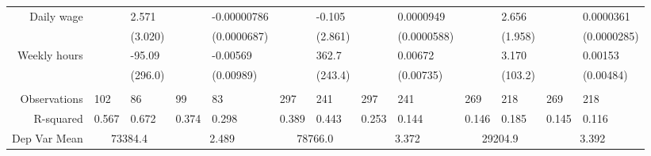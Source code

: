 \begin{tabular}{rrrrrrrrrrrrr}
Daily wage & \multicolumn{1}{l}{} & \multicolumn{1}{l}{2.571} & \multicolumn{1}{l}{} & \multicolumn{1}{l}{-0.00000786} & \multicolumn{1}{l}{} & \multicolumn{1}{l}{-0.105} & \multicolumn{1}{l}{} & \multicolumn{1}{l}{0.0000949} & \multicolumn{1}{l}{} & \multicolumn{1}{l}{2.656} & \multicolumn{1}{l}{} & \multicolumn{1}{l}{0.0000361} \\
      & \multicolumn{1}{l}{} & \multicolumn{1}{l}{(3.020)} & \multicolumn{1}{l}{} & \multicolumn{1}{l}{(0.0000687)} & \multicolumn{1}{l}{} & \multicolumn{1}{l}{(2.861)} & \multicolumn{1}{l}{} & \multicolumn{1}{l}{(0.0000588)} & \multicolumn{1}{l}{} & \multicolumn{1}{l}{(1.958)} & \multicolumn{1}{l}{} & \multicolumn{1}{l}{(0.0000285)} \\
Weekly hours & \multicolumn{1}{l}{} & \multicolumn{1}{l}{-95.09} & \multicolumn{1}{l}{} & \multicolumn{1}{l}{-0.00569} & \multicolumn{1}{l}{} & \multicolumn{1}{l}{362.7} & \multicolumn{1}{l}{} & \multicolumn{1}{l}{0.00672} & \multicolumn{1}{l}{} & \multicolumn{1}{l}{3.170} & \multicolumn{1}{l}{} & \multicolumn{1}{l}{0.00153} \\
      & \multicolumn{1}{l}{} & \multicolumn{1}{l}{(296.0)} & \multicolumn{1}{l}{} & \multicolumn{1}{l}{(0.00989)} & \multicolumn{1}{l}{} & \multicolumn{1}{l}{(243.4)} & \multicolumn{1}{l}{} & \multicolumn{1}{l}{(0.00735)} & \multicolumn{1}{l}{} & \multicolumn{1}{l}{(103.2)} & \multicolumn{1}{l}{} & \multicolumn{1}{l}{(0.00484)} \\
      & \multicolumn{1}{l}{} & \multicolumn{1}{l}{} & \multicolumn{1}{l}{} & \multicolumn{1}{l}{} & \multicolumn{1}{l}{} & \multicolumn{1}{l}{} & \multicolumn{1}{l}{} & \multicolumn{1}{l}{} & \multicolumn{1}{l}{} & \multicolumn{1}{l}{} & \multicolumn{1}{l}{} & \multicolumn{1}{l}{} \\
      \midrule
Observations & \multicolumn{1}{l}{102} & \multicolumn{1}{l}{86} & \multicolumn{1}{l}{99} & \multicolumn{1}{l}{83} & \multicolumn{1}{l}{297} & \multicolumn{1}{l}{241} & \multicolumn{1}{l}{297} & \multicolumn{1}{l}{241} & \multicolumn{1}{l}{269} & \multicolumn{1}{l}{218} & \multicolumn{1}{l}{269} & \multicolumn{1}{l}{218} \\
R-squared & \multicolumn{1}{l}{0.567} & \multicolumn{1}{l}{0.672} & \multicolumn{1}{l}{0.374} & \multicolumn{1}{l}{0.298} & \multicolumn{1}{l}{0.389} & \multicolumn{1}{l}{0.443} & \multicolumn{1}{l}{0.253} & \multicolumn{1}{l}{0.144} & \multicolumn{1}{l}{0.146} & \multicolumn{1}{l}{0.185} & \multicolumn{1}{l}{0.145} & \multicolumn{1}{l}{0.116} \\
Dep Var Mean & \multicolumn{2}{c}{73384.4} & \multicolumn{2}{c}{2.489} & \multicolumn{2}{c}{78766.0} & \multicolumn{2}{c}{3.372} & \multicolumn{2}{c}{29204.9} & \multicolumn{2}{c}{3.392} \\
\bottomrule
\end{tabular}%
